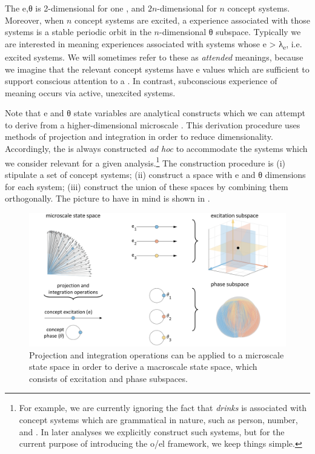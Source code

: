   The e,θ  is 2-di\-men\-sional for one , and $2n$-di\-men\-sional for $n$ concept systems. Moreover, when $n$ concept systems are excited, a  experience associated with those systems is a stable periodic orbit in the $n${}-di\-men\-sional θ subspace. Typically we are interested in meaning experiences associated with systems whose e > λ\textsubscript{e}, i.e. excited systems. We will sometimes refer to these as \textit{attended} meanings, because we imagine that the relevant concept systems have e values which are sufficient to support conscious attention to a . In contrast, subconscious experience of meaning occurs via active, unexcited systems.

  Note that e and θ state variables are analytical constructs which we can attempt to derive from a higher-di\-men\-sional microscale . This derivation procedure uses methods of projection and integration in order to reduce dimensionality. Accordingly, the  is always constructed \textit{ad hoc} to accommodate the systems which we consider relevant for a given analysis.\footnote{For example, we are currently ignoring the fact that \textit{drinks} is associated with concept systems which are grammatical in nature, such as person, number, and . In later analyses we explicitly construct such systems, but for the current purpose of introducing the o/el framework, we keep things simple.} The  construction procedure is (i) stipulate a set of concept systems; (ii) construct a space with e and θ dimensions for each system; (iii) construct the union of these spaces by combining them orthogonally. The picture to have in mind is shown in {}. 

  
\begin{figure}
\includegraphics[width=\textwidth]{figures/Tilsen-img14.png}
\caption{Projection and integration operations can be applied to a microscale state space in order to derive a macroscale state space, which consists of excitation and phase subspaces.}
\label{fig:2:7}
\end{figure}
 

